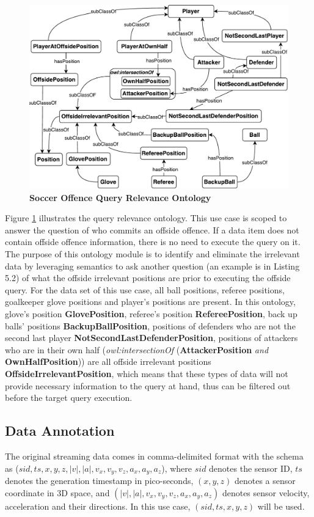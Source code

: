 \begin{figure}[!htbp]
	\centering
	\includegraphics[width=5in]{img/5-qronto}
	\caption{\textbf{Soccer Offence Query Relevance Ontology}}
	\label{fig:dlonto}
\end{figure}

Figure \ref{fig:dlonto} illustrates the query relevance ontology. 
This use case is scoped to answer the question of who commits an offside offence. 
If a data item does not contain offside offence information, there is no need to execute the query on it. 
The purpose of this ontology module is to identify and eliminate the irrelevant data by leveraging semantics to ask another question (an example is in Listing 5.2) of what the offside irrelevant positions are prior to executing the offside query.
For the data set of this use case, all ball positions, referee positions, goalkeeper glove positions and player's positions are present. 
In this ontology, glove's position \textbf{GlovePosition}, referee's position \textbf{RefereePosition}, back up balls' positions \textbf{BackupBallPosition}, positions of defenders who are not the second last player \textbf{NotSecondLastDefenderPosition}, positions of attackers who are in their own half (\textit{owl:intersectionOf} (\textbf{AttackerPosition} \textit{and} \textbf{OwnHalfPosition})) are all offside irrelevant positions \textbf{OffsideIrrelevantPosition}, which means that these types of data will not provide necessary information to the query at hand, thus can be filtered out before the target query execution. 
%
\subsection{Data Annotation}
The original streaming data comes in comma-delimited format with the schema as  ($sid, ts, x, y, z, \left|v\right|, \left|a\right|, v_{x}, v_{y}, v_{z}, a_{x}, a_{y}, a_{z}$), where $sid$ denotes the sensor ID, $ts$ denotes the generation timestamp in pico-seconds, $(x, y, z)$ denotes a sensor coordinate in 3D space, and $(\left|v\right|, \left|a\right|, v_{x}, v_{y}, v_{z}, a_{x}, a_{y}, a_{z})$ denotes sensor velocity, acceleration and their directions.
In this use case, $(sid, ts, x, y, z)$ will be used.

